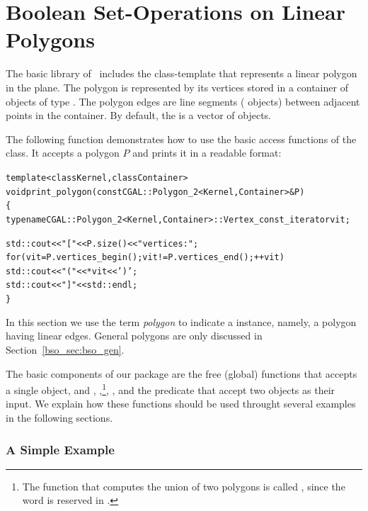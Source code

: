 \section{Boolean Set-Operations on Linear Polygons\label{bso_sec:bso_lin}}

The basic library of \cgal\ includes the 
class-template that represents a linear polygon in the plane. The
polygon is represented by its vertices stored in a container of
objects of type . The polygon edges are line
segments ( objects) between adjacent points in
the container. By default, the  is a vector of
 objects.

The following function demonstrates how to use the basic access
functions of the  class. It accepts a polygon $P$ and
prints it in a readable format:
\begin{alltt}
template<class Kernel, class Container>
void print_polygon (const CGAL::Polygon_2<Kernel, Container>& P)
\{
  typename CGAL::Polygon_2<Kernel, Container>::Vertex_const_iterator  vit;

  std::cout << "[ " << P.size() << " vertices:";
  for (vit = P.vertices_begin(); vit != P.vertices_end(); ++vit)
    std::cout << " (" << *vit << ')';
  std::cout << " ]" << std::endl;
\}
\end{alltt}

In this section we use the term {\em polygon} to indicate a
 instance, namely, a polygon having linear
edges. General polygons are only discussed in
Section~\ref{bso_sec:bso_gen}.

The basic components of our package are the free (global) functions
 that accepts a single  object, and
, ,\footnote{The function that
computes the union of two polygons is called , since
the word  is reserved in \CC.}, ,
 and the predicate 
that accept two  objects as their input. We explain how
these functions should be used throught several examples in the
following sections.

\subsubsection*{A Simple Example}

